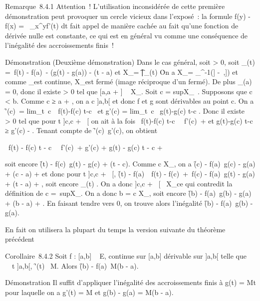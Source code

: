 \documentclass[]{article}
\begin{document}
Remarque~8.4.1 Attention~! L'utilisation inconsidérée de cette première
démonstration peut provoquer un cercle vicieux dans l'exposé~: la
formule f(y) - f(x) =\int ~
_x^yf'(t) dt fait appel de manière cachée au fait qu'une
fonction de dérivée nulle est constante, ce qui est en général vu comme
une conséquence de l'inégalité des accroissements finis~!

Démonstration (Deuxième démonstration) Dans le cas général, soit \epsilon
> 0, soit \phi_\epsilon(t) =\ f(t)
- f(a)\ - (g(t) - g(a)) - \epsilon(t - a) et
X_\epsilon = \t \in
[a,b]∣\phi_\epsilon(t) \leq
\epsilon\. On a X_\epsilon = \phi_\epsilon^-1(]
-\infty~,\epsilon]) et comme \phi_\epsilon est continue, X_\epsilon est fermé
(image réciproque d'un fermé). De plus \phi_\epsilon(a) = 0, donc il
existe \eta > 0 tel que [a,a + \eta] \subset~ X_\epsilon. Soit c
= supX_\epsilon~. Supposons que c <
b. Comme c ≥ a + \eta, on a c \in]a,b[ et donc f et g sont dérivables au
point c. On a \f'(c)\
= lim_t\rightarrow~c~\
f(t)-f(c) \over t-c \ et g'(c)
= lim_t\rightarrow~c~ g(t)-g(c)
\over t-c . Donc il existe \alpha~ > 0 tel que
pour t \in]c,c + \alpha~[ on ait à la fois \
f(t)-f(c) \over t-c \
\leq\ f'(c)\ + \epsilon
\over 2 et  g(t)-g(c) \over t-c ≥
g'(c) - \epsilon \over 2 . Tenant compte de
\f'(c)\ \leq g'(c), on
obtient

\ f(t) - f(c) \over t - c
\ \leq\
f'(c)\ + \epsilon {} \leq g'(c)
+ \epsilon {} \leq g(t) - g(c) \over t -
c + \epsilon

soit encore \f(t) -
f(c)\ \leq g(t) - g(c) + \epsilon(t - c). Comme c \in
X_\epsilon, on a \f(c) -
f(a)\ \leq g(c) - g(a) + \epsilon(c - a) + \epsilon et donc pour
t \in]c,c + \alpha~[, \f(t) -
f(a)\ \leq\ f(t) -
f(c)\ +\ f(c) -
f(a)\ \leq g(t) - g(a) + \epsilon(t - a) + \epsilon, soit encore
\phi_\epsilon(t) \leq \epsilon. On a donc ]c,c + \alpha~[\subset~ X_\epsilon ce qui
contredit la définition de c =\
supX_\epsilon. On a donc b = c \in X_\epsilon, soit encore
\f(b) - f(a)\ \leq g(b) -
g(a) + \epsilon(b - a) + \epsilon. En faisant tendre \epsilon vers 0, on trouve alors
l'inégalité \f(b) -
f(a)\ \leq g(b) - g(a).

En fait on utilisera la plupart du temps la version suivante du théorème
précédent

Corollaire~8.4.2 Soit f : [a,b] \rightarrow~ E, continue sur [a,b]
dérivable sur ]a,b[ telle que \forall~~t
\in]a,b[, \f'(t)\ \leq
M. Alors \f(b) - f(a)\
\leq M(b - a).

Démonstration Il suffit d'appliquer l'inégalité des accroissements finis
à g(t) = Mt pour laquelle on a g'(t) = M et g(b) - g(a) = M(b - a).
\end{document}

